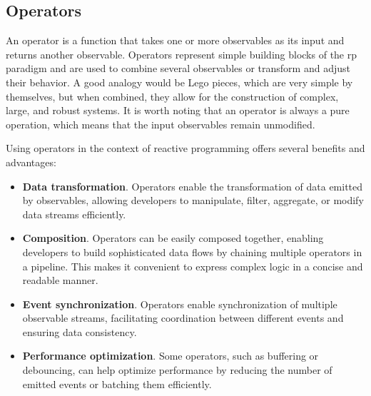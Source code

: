 

\subsection{Operators}

An operator is a function that takes one or more observables as its input and returns another
observable.
Operators represent simple building blocks of the \ac{rp} paradigm and are used to combine several
observables or transform and adjust their behavior.
A good analogy would be Lego pieces, which are very simple by themselves, but when
combined, they allow for the construction of complex, large, and robust systems.
It is worth noting that an operator is always a pure operation, which means that the input
observables remain unmodified.

Using operators in the context of reactive programming offers several benefits and advantages:
\begin{itemize}
  \item \textbf{Data transformation}. Operators enable the transformation of data emitted by observables, allowing           developers to manipulate, filter, aggregate, or modify data streams efficiently.
  \item \textbf{Composition}.
        Operators can be easily composed together, enabling developers to build sophisticated data flows by chaining multiple operators in a pipeline. This makes it convenient to express complex logic in a concise and readable manner.
  \item \textbf{Event synchronization}.
        Operators enable synchronization of multiple observable streams, facilitating coordination between different events and ensuring data consistency.
  \item \textbf{Performance optimization}.
        Some operators, such as buffering or debouncing, can help optimize performance by reducing the number of emitted events or batching them efficiently.
\end{itemize}

